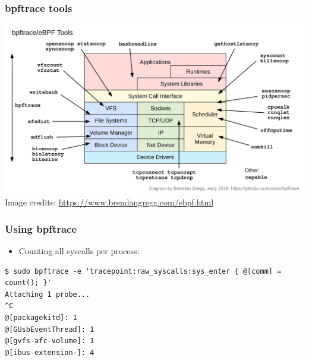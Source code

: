 \begin{frame}[fragile]
  \frametitle{bpftrace tools}

  \begin{center}
    \includegraphics[height=0.8\textheight]{slides/debugging-system-wide-profiling/bpftrace_tools_early2019.png}\\
    \tiny Image credits: \url{https://www.brendangregg.com/ebpf.html}
  \end{center}
\end{frame}

\begin{frame}[fragile]
  \frametitle{Using bpftrace}
  \begin{itemize}
    \item Counting all syscalls per process:
  \end{itemize}
  \begin{block}{}
    \begin{verbatim}
$ sudo bpftrace -e 'tracepoint:raw_syscalls:sys_enter { @[comm] = count(); }'
Attaching 1 probe...
^C
@[packagekitd]: 1
@[GUsbEventThread]: 1
@[gvfs-afc-volume]: 1
@[ibus-extension-]: 4
    \end{verbatim}
  \end{block}
\end{frame}

